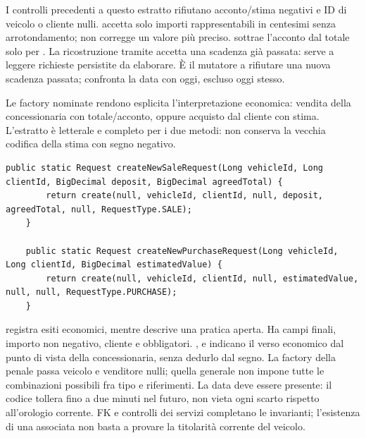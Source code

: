 I controlli precedenti a questo estratto rifiutano acconto/stima negativi
e ID di veicolo o cliente nulli.  accetta solo importi
rappresentabili in centesimi senza arrotondamento; non corregge un valore
più preciso.  sottrae l'acconto dal totale solo
per . La ricostruzione tramite  accetta una
scadenza già passata: serve a leggere richieste persistite da elaborare.
È il mutatore  a rifiutare una nuova scadenza passata;
 confronta la data con oggi, escluso oggi stesso.

Le factory nominate rendono esplicita l'interpretazione economica:
vendita della concessionaria con totale/acconto, oppure acquisto dal
cliente con stima. L'estratto è letterale e completo per i due metodi:
non conserva la vecchia codifica della stima con segno negativo.

\noindent\begin{minipage}{\linewidth}
\begin{lstlisting}[firstnumber=68,gobble=4,caption={Factory dei due tipi di pratica, senza codifica del segno.},label=lst:request-factory]
    public static Request createNewSaleRequest(Long vehicleId, Long clientId, BigDecimal deposit, BigDecimal agreedTotal) {
        return create(null, vehicleId, clientId, null, deposit, agreedTotal, null, RequestType.SALE);
    }

    public static Request createNewPurchaseRequest(Long vehicleId, Long clientId, BigDecimal estimatedValue) {
        return create(null, vehicleId, clientId, null, estimatedValue, null, null, RequestType.PURCHASE);
    }
\end{lstlisting}
\end{minipage}

 registra esiti economici, mentre  descrive
una pratica aperta. Ha campi finali, importo non negativo, cliente e
 obbligatori. ,  e 
indicano il verso economico dal punto di vista della concessionaria,
senza dedurlo dal segno. La factory della penale passa veicolo e venditore
nulli; quella generale non impone tutte le combinazioni possibili fra tipo
e riferimenti. La data deve essere presente: il codice tollera fino a due
minuti nel futuro, non vieta ogni scarto rispetto all'orologio corrente.
FK e controlli dei servizi completano le invarianti; l'esistenza di una
 associata non basta a provare la titolarità corrente del veicolo.

